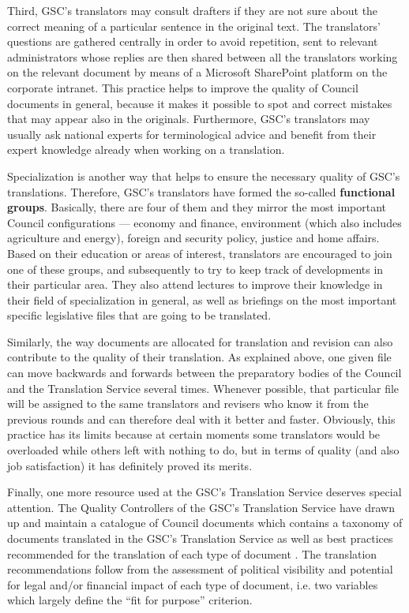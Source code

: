 \documentclass[output=paper]{langsci/langscibook}
\begin{document}
Third, GSC’s translators may consult drafters if they are not sure about the correct meaning of a particular sentence in the original text. The translators’ questions are gathered centrally in order to avoid repetition, sent to relevant administrators whose replies are then shared between all the translators working on the relevant document by means of a Microsoft SharePoint platform on the corporate intranet. This practice helps to improve the quality of Council documents in general, because it makes it possible to spot and correct mistakes that may appear also in the originals. Furthermore, GSC’s translators may usually ask national experts for terminological advice and benefit from their expert knowledge already when working on a translation.

Specialization is another way that helps to ensure the necessary quality of GSC’s translations. Therefore, GSC’s translators have formed the so-called \textbf{functional groups}. Basically, there are four of them and they mirror the most important Council configurations — economy and finance, environment (which also includes agriculture and energy), foreign and security policy, justice and home affairs. Based on their education or areas of interest, translators are encouraged to join one of these groups, and subsequently to try to keep track of developments in their particular area. They also attend lectures to improve their knowledge in their field of specialization in general, as well as briefings on the most important specific legislative files that are going to be translated.

Similarly, the way documents are allocated for translation and revision can also contribute to the quality of their translation. As explained above, one given file can move backwards and forwards between the preparatory bodies of the Council and the Translation Service several times. Whenever possible, that particular file will be assigned to the same translators and revisers who know it from the previous rounds and can therefore deal with it better and faster. Obviously, this practice has its limits because at certain moments some translators would be overloaded while others left with nothing to do, but in terms of quality (and also job satisfaction) it has definitely proved its merits.

Finally, one more resource used at the GSC’s Translation Service deserves special attention. The Quality Controllers of the GSC’s Translation Service have drawn up and maintain a catalogue of Council documents which contains a taxonomy of documents translated in the GSC’s Translation Service as well as best practices recommended for the translation of each type of document \citep{Council2010b}. The translation recommendations follow from the assessment of political visibility and potential for legal and/or financial impact of each type of document, i.e. two variables which largely define the “fit for purpose” criterion.
\end{document}
